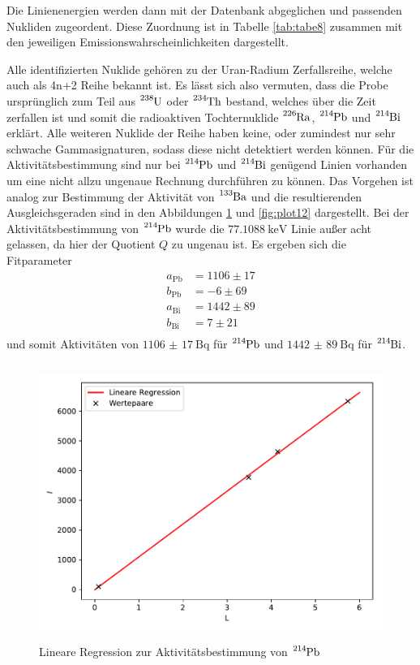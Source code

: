 
Die Linienenergien werden dann mit der Datenbank \cite{lara} abgeglichen und
passenden Nukliden zugeordent.
Diese Zuordnung ist in Tabelle \ref{tab:tabe8} zusammen mit den jeweiligen Emissionswahrscheinlichkeiten
dargestellt.

Alle identifizierten Nuklide gehören zu der Uran-Radium Zerfallsreihe, welche auch als 4n+2
Reihe bekannt ist. Es lässt sich also vermuten, dass die Probe ursprünglich zum Teil aus
$\ce{^{238}U}$ oder $\ce{^{234}Th}$ bestand, welches über  die Zeit zerfallen ist und somit die
radioaktiven Tochternuklide $\ce{^{226}Ra}$, $\ce{^{214}Pb}$ und $\ce{^{214}Bi}$ erklärt.
Alle weiteren Nuklide der Reihe haben keine, oder zumindest nur sehr schwache
Gammasignaturen, sodass diese nicht detektiert werden können.
Für die Aktivitätsbestimmung sind nur bei $\ce{^{214}Pb}$ und $\ce{^{214}Bi}$ genügend
Linien vorhanden um eine nicht allzu ungenaue Rechnung durchführen zu können. Das Vorgehen ist analog zur
Bestimmung der Aktivität von $\ce{^{133}Ba}$ und die resultierenden Ausgleichsgeraden sind in den
Abbildungen \ref{fig:plot11} und \ref{fig:plot12} dargestellt. Bei der Aktivitätsbestimmung
von $\ce{^{214}Pb}$ wurde die $\SI{77.1088}{\kilo\electronvolt}$ Linie außer acht gelassen,
da hier der Quotient $Q$ zu ungenau ist.
Es ergeben sich die Fitparameter
\begin{align*}
  a_{\text{Pb}} &= 1106 \pm 17 \\
  b_{\text{Pb}} &= -6\pm 69 \\
  a_{\text{Bi}} &= 1442 \pm 89 \\
  b_{\text{Bi}} &= 7 \pm 21 \\
\end{align*}
und somit Aktivitäten von $\SI{1106(17)}{\becquerel} $ für $\ce{^{214}Pb}$ und
$\SI{1442(89)}{\becquerel} $ für $\ce{^{214}Bi}$.
\begin{figure}
  \centering
  \includegraphics[height=9cm]{Plot11.pdf}
  \caption{Lineare Regression zur Aktivitätsbestimmung von $\ce{^{214}Pb}$}
  \label{fig:plot11}
\end{figure}
